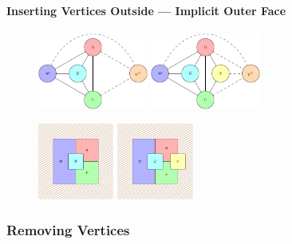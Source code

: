 \documentclass[t,18pt]{beamer}
\newcommand{\emdash}{---}
\begin{document}
\begin{frame}[c]
  \frametitle{}
  \framesubtitle{Inserting Vertices Outside \emdash{} Implicit Outer Face}
  \begin{figure}
    \includegraphics[height=2.5cm]{../Thesis/Resources/InsertVertex-Duality-1.pdf}
    \quad
    \includegraphics[height=2.5cm]{../Thesis/Resources/InsertVertex-Duality-2.pdf}
  \end{figure}
  \begin{figure}
    \includegraphics[height=2.5cm]{../Thesis/Resources/InsertVertex-Duality-3.pdf}
    \qquad\qquad
    \includegraphics[height=2.5cm]{../Thesis/Resources/InsertVertex-Duality-4.pdf}
  \end{figure}
\end{frame}

\subsubsection{Removing Vertices}
\label{subsubsect:removing-vertices}
\end{document}
